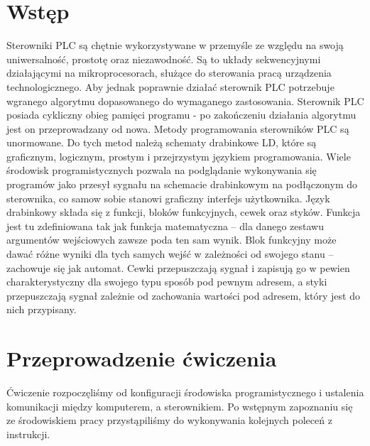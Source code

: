 \documentclass[a4paper, 12pt]{article}
\begin{document}
	\section{Wstęp}
		Sterowniki PLC są chętnie wykorzystywane w przemyśle ze względu na swoją uniwersalność, prostotę oraz niezawodność. Są to układy sekwencyjnymi działającymi na mikroprocesorach, służące do sterowania pracą urządzenia technologicznego. Aby jednak poprawnie działać sterownik PLC potrzebuje wgranego algorytmu dopasowanego do wymaganego zastosowania. Sterownik PLC posiada cykliczny obieg pamięci programu - po zakończeniu działania algorytmu jest on przeprowadzany od nowa.
		\newline
		\newline
		\noindent Metody programowania sterowników PLC są unormowane. Do tych metod należą schematy drabinkowe LD, które są graficznym, logicznym, prostym i przejrzystym językiem programowania. Wiele środowisk programistycznych pozwala na podglądanie wykonywania się programów jako przesył sygnału na schemacie drabinkowym na podłączonym do sterownika, co samo\linebreak w sobie stanowi graficzny interfejs użytkownika.
		\newline
		\newline 
		Język drabinkowy składa się z funkcji, bloków funkcyjnych, cewek oraz styków. Funkcja jest tu zdefiniowana tak jak funkcja matematyczna -- dla danego zestawu argumentów wejściowych zawsze poda ten sam wynik. Blok funkcyjny może dawać różne wyniki dla tych samych wejść w zależności od swojego stanu -- zachowuje się jak automat. Cewki przepuszczają sygnał i zapisują go w pewien charakterystyczny dla swojego typu sposób pod pewnym adresem, a styki przepuszczają sygnał zależnie od zachowania wartości pod adresem, który jest do nich przypisany.
	\section{Przeprowadzenie ćwiczenia}
		Ćwiczenie rozpoczęliśmy od konfiguracji środowiska programistycznego i ustalenia komunikacji między komputerem, a sterownikiem. Po wstępnym zapoznaniu się ze środowiskiem pracy przystąpiliśmy do wykonywania kolejnych poleceń z instrukcji.
\end{document}
